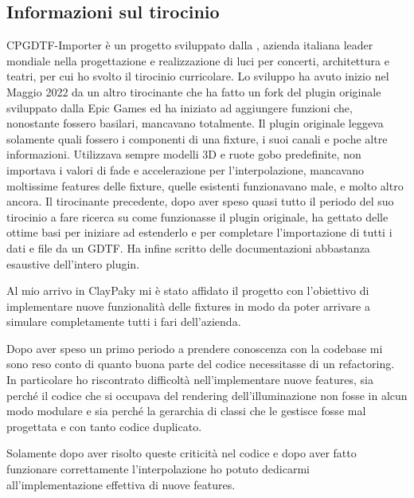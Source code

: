 \documentclass[main.tex]{subfiles}
\begin{document}
\subsection{Informazioni sul tirocinio}\label{subsec:1_tirocinio}
CPGDTF-Importer è un progetto sviluppato dalla , azienda italiana leader mondiale nella progettazione e realizzazione di luci per concerti, architettura e teatri, per cui ho svolto il tirocinio curricolare. Lo sviluppo ha avuto inizio nel Maggio 2022 da un altro tirocinante che ha fatto un fork del plugin originale sviluppato dalla Epic Games ed ha iniziato ad aggiungere funzioni che, nonostante fossero basilari, mancavano totalmente. Il plugin originale leggeva solamente quali fossero i componenti di una fixture, i suoi canali e poche altre informazioni. Utilizzava sempre modelli 3D e ruote gobo predefinite, non importava i valori di fade e accelerazione per l'interpolazione, mancavano moltissime features delle fixture, quelle esistenti funzionavano male, e molto altro ancora. Il tirocinante precedente, dopo aver speso quasi tutto il periodo del suo tirocinio a fare ricerca su come funzionasse il plugin originale, ha gettato delle ottime basi per iniziare ad estenderlo e per completare l'importazione di tutti i dati e file da un GDTF. Ha infine scritto delle documentazioni abbastanza esaustive dell'intero plugin.\newline

Al mio arrivo in ClayPaky mi è stato affidato il progetto con l'obiettivo di implementare nuove funzionalità delle fixtures in modo da poter arrivare a simulare completamente tutti i fari dell'azienda.

Dopo aver speso un primo periodo a prendere conoscenza con la codebase mi sono reso conto di quanto buona parte del codice necessitasse di un refactoring. In particolare ho riscontrato difficoltà nell'implementare nuove features, sia perché il codice che si occupava del rendering dell'illuminazione non fosse in alcun modo modulare e sia perché la gerarchia di classi che le gestisce fosse mal progettata e con tanto codice duplicato. 

Solamente dopo aver risolto queste criticità nel codice e dopo aver fatto funzionare correttamente l'interpolazione ho potuto dedicarmi all'implementazione effettiva di nuove features. 

\end{document}
